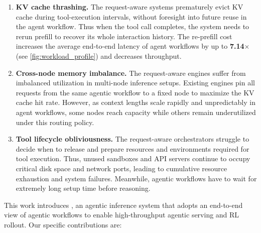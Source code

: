 \begin{enumerate}[itemsep=1pt,topsep=2pt,leftmargin=*]
\item
\textbf{KV cache thrashing.} The request-aware systems prematurely evict KV cache during tool-execution intervals, without foresight into future reuse in the agent workflow.
Thus when the tool call completes, the system needs to rerun prefill to recover its whole interaction history. The re-prefill cost increases the average end-to-end latency of agent workflows by up to \textbf{7.14$\times$} (see \autoref{fig:workload_profile}) and decreases throughput.

\item
\textbf{Cross-node memory imbalance.} The request-aware engines suffer from imbalanced utilization in multi-node inference setups.
Existing engines pin all requests from the same agentic workflow to a fixed node to maximize the KV cache hit rate.
However, as context lengths scale rapidly and unpredictably in agent workflows,
some nodes reach capacity while others remain underutilized under this routing policy.

\item
\textbf{Tool lifecycle obliviousness.}
The request-aware orchestrators struggle to decide when to release and prepare resources and environments required for tool execution.
Thus, unused sandboxes and API servers continue to occupy critical disk space and network ports, leading to cumulative resource exhaustion and system failures.
Meanwhile, agentic workflows have to wait for extremely long setup time before reasoning.
\end{enumerate}

This work introduces \ouralg, an agentic inference system that adopts an end-to-end view of agentic workflows to enable high-throughput agentic serving and RL rollout.
Our specific contributions are:


